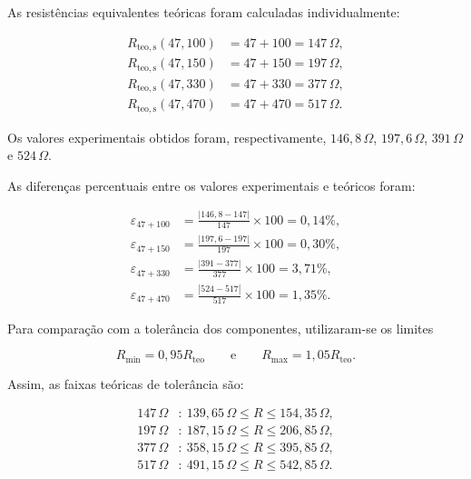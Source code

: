 \documentclass[a4paper,12pt]{article}
\begin{document}
As resistências equivalentes teóricas foram calculadas individualmente:

\[
\begin{aligned}
R_{\mathrm{teo,s}}(47,100)
  &=47+100
   =147\,\Omega,\\[0.2cm]
R_{\mathrm{teo,s}}(47,150)
  &=47+150
   =197\,\Omega,\\[0.2cm]
R_{\mathrm{teo,s}}(47,330)
  &=47+330
   =377\,\Omega,\\[0.2cm]
R_{\mathrm{teo,s}}(47,470)
  &=47+470
   =517\,\Omega.
\end{aligned}
\]

Os valores experimentais obtidos foram, respectivamente,
$146{,}8\,\Omega$, $197{,}6\,\Omega$, $391\,\Omega$ e
$524\,\Omega$.

As diferenças percentuais entre os valores experimentais e teóricos foram:

\[
\begin{aligned}
\varepsilon_{47+100}
  &=
  \frac{|146{,}8-147|}{147}\times100
  =0{,}14\%,\\[0.2cm]
\varepsilon_{47+150}
  &=
  \frac{|197{,}6-197|}{197}\times100
  =0{,}30\%,\\[0.2cm]
\varepsilon_{47+330}
  &=
  \frac{|391-377|}{377}\times100
  =3{,}71\%,\\[0.2cm]
\varepsilon_{47+470}
  &=
  \frac{|524-517|}{517}\times100
  =1{,}35\%.
\end{aligned}
\]

Para comparação com a tolerância dos componentes, utilizaram-se os limites

\[
  R_{\min}=0{,}95R_{\mathrm{teo}}
  \qquad\text{e}\qquad
  R_{\max}=1{,}05R_{\mathrm{teo}}.
\]

Assim, as faixas teóricas de tolerância são:

\[
\begin{aligned}
147\,\Omega &:\
139{,}65\,\Omega
\leq R \leq
154{,}35\,\Omega,\\
197\,\Omega &:\
187{,}15\,\Omega
\leq R \leq
206{,}85\,\Omega,\\
377\,\Omega &:\
358{,}15\,\Omega
\leq R \leq
395{,}85\,\Omega,\\
517\,\Omega &:\
491{,}15\,\Omega
\leq R \leq
542{,}85\,\Omega.
\end{aligned}
\]
\end{document}
